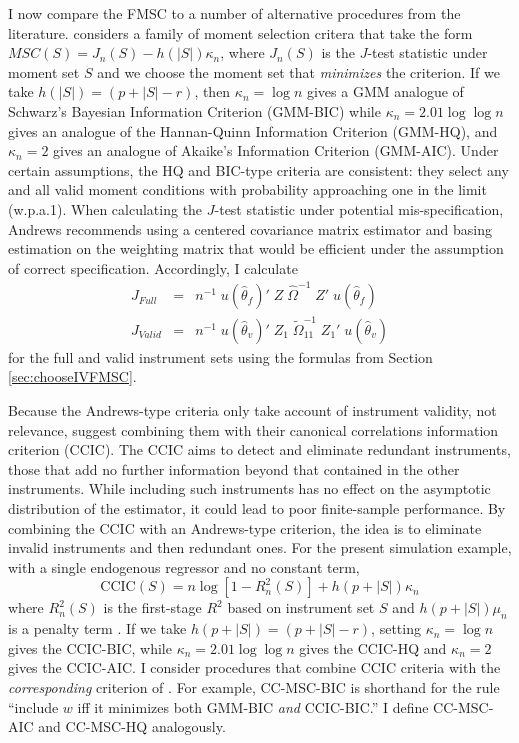 \documentclass[12pt]{article}
\theoremstyle{definition}
\begin{document}
I now compare the FMSC to a number of alternative procedures from the literature. \cite{Andrews1999} considers a family of moment selection critera that take the form $MSC(S) = J_n(S) - h(|S|)\kappa_n$, where $J_n(S)$ is the $J$-test statistic under moment set $S$ and we choose the moment set that \emph{minimizes} the criterion. If we take $h(|S|) = (p + |S| - r)$, then $\kappa_n = \log{n}$ gives a GMM analogue of Schwarz's Bayesian Information Criterion (GMM-BIC) while $\kappa_n = 2.01 \log{\log{n}}$ gives an analogue of the Hannan-Quinn Information Criterion (GMM-HQ), and $\kappa_n = 2$ gives an analogue of Akaike's Information Criterion (GMM-AIC). Under certain assumptions, the HQ and BIC-type criteria are consistent: they select any and all valid moment conditions with probability approaching one in the limit (w.p.a.1). When calculating the $J$-test statistic under potential mis-specification, Andrews recommends using a centered covariance matrix estimator and basing estimation on the weighting matrix that would be efficient under the assumption of correct specification. Accordingly, I calculate
	\begin{eqnarray}
		J_{Full} &=&n^{-1}\; u( \widehat{\theta}_{f})'\;Z \; \widehat{\Omega}^{-1} \;Z' \;u( \widehat{\theta}_{f})\\
		J_{Valid} &=&n^{-1}\; u( \widehat{\theta}_{v})'\;Z_1 \;\widetilde{\Omega}_{11}^{-1} \;Z_1'\;u( \widehat{\theta}_{v})
	\end{eqnarray}
for the full and valid instrument sets using the formulas from Section \ref{sec:chooseIVFMSC}. 

Because the Andrews-type criteria only take account of instrument validity, not relevance, \cite{HallPeixe2003} suggest combining them with their canonical correlations information criterion (CCIC). The CCIC aims to detect and eliminate redundant instruments, those that add no further information beyond that contained in the other instruments. While including such instruments has no effect on the asymptotic distribution of the estimator, it could lead to poor finite-sample performance. By combining the CCIC with an Andrews-type criterion, the idea is to eliminate invalid instruments and then redundant ones. For the present simulation example, with a single endogenous regressor and no constant term, 
	\begin{equation}
	\mbox{CCIC}(S) = n \log\left[1 - R_n^2(S) \right] + h(p + |S|)\kappa_n
	\end{equation}
where $R_n^2(S)$ is the first-stage $R^2$ based on instrument set $S$ and $h(p + |S|)\mu_n$ is a penalty term \citep{Jana2005}. If we take $h(p + |S|) = (p + |S| - r)$, setting $\kappa_n = \log{n}$ gives the CCIC-BIC, while $\kappa_n = 2.01 \log{\log{n}}$ gives the CCIC-HQ  and $\kappa_n = 2$ gives the CCIC-AIC. I consider procedures that combine CCIC criteria with the \emph{corresponding} criterion of \cite{Andrews1999}. For example, CC-MSC-BIC is shorthand for the rule ``include $w$ iff it minimizes both  GMM-BIC \emph{and} CCIC-BIC.'' I define CC-MSC-AIC and CC-MSC-HQ analogously.
\end{document}
